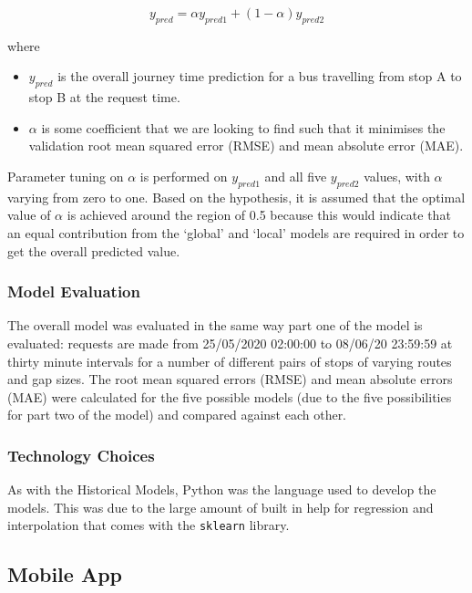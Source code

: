 \begin{equation}
\label{eq:regression-overall}
    y_{pred} = \alpha y_{pred1} + (1 - \alpha)y_{pred2}
\end{equation}

where 
\begin{itemize}
    \item $y_{pred}$ is the overall journey time prediction for a bus travelling from stop A to stop B at the request time.
    \item $\alpha$ is some coefficient that we are looking to find such that it minimises the validation root mean squared error (RMSE) and mean absolute error (MAE). 
\end{itemize}

Parameter tuning on $\alpha$ is performed on $y_{pred1}$ and all five $y_{pred2}$ values, with $\alpha$ varying from zero to one. Based on the hypothesis, it is assumed that the optimal value of $\alpha$ is achieved around the region of 0.5 because this would indicate that an equal contribution from the `global' and `local' models are required in order to get the overall predicted value.

\subsubsection{Model Evaluation}

The overall model was evaluated in the same way part one of the model is evaluated: requests are made from 25/05/2020 02:00:00 to 08/06/20 23:59:59 at thirty minute intervals for a number of different pairs of stops of varying routes and gap sizes. The root mean squared errors (RMSE) and mean absolute errors (MAE) were calculated for the five possible models (due to the five possibilities for part two of the model) and compared against each other. \\

\subsubsection{Technology Choices}

As with the Historical Models, Python was the language used to develop the models. This was due to the large amount of built in help for regression and interpolation that comes with the \texttt{sklearn} library. 

\subsection{Mobile App}

